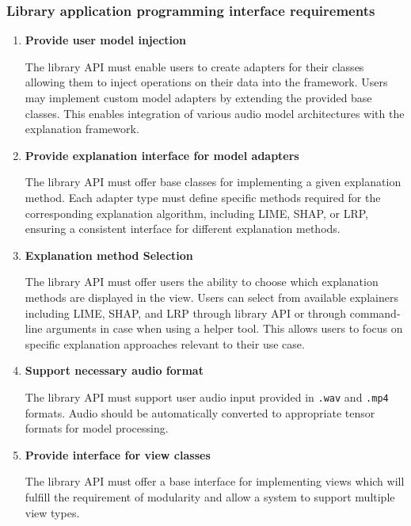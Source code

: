 \documentclass[
    bindingoffset=5mm,  %
    footnoteindent=3mm, %
    hyphenation=true    %
]{src/wut-thesis}
\begin{document}
\subsubsection{Library application programming interface requirements}
    \begin{enumerate}[itemsep=1\baselineskip]

    \item \textbf{Provide user model injection}

        The library API must enable users to create adapters for their classes allowing them to inject operations on
    their data into the framework. Users may implement custom model adapters by extending the provided base
    classes. This enables integration of various audio model architectures with the explanation
    framework.

    \item \textbf{Provide explanation interface for model adapters}

        The library API must offer base classes for implementing a given explanation method.
    Each adapter type must define specific methods required for the corresponding explanation algorithm,
    including LIME, SHAP, or LRP, ensuring a consistent interface for different explanation methods.

    \item \textbf{Explanation method Selection}

        The library API must offer users the ability to choose which explanation methods are displayed in the view.
    Users can select from available explainers including LIME, SHAP, and LRP through library API or through
    command-line arguments in case when using a helper tool. This allows users to focus on specific explanation
    approaches relevant to their use case.

    \item \textbf{Support necessary audio format}

        The library API must support user audio input provided in \texttt{.wav} and \texttt{.mp4} formats.
    Audio should be automatically converted to appropriate tensor formats for model processing.

    \item \textbf{Provide interface for view classes}

        The library API must offer a base interface for implementing views which will fulfill
    the requirement of modularity and allow a system to support multiple view types.


\end{enumerate}
\end{document}
